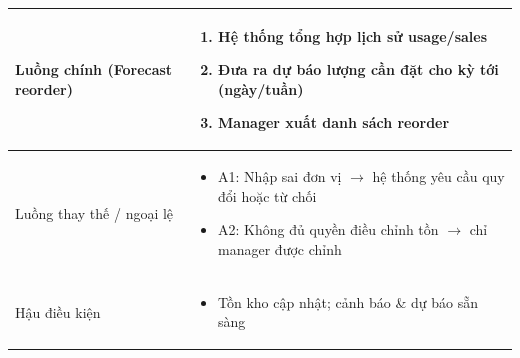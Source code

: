 \begin{longtable}{|>{\raggedright\arraybackslash}p{}|>{\raggedright\arraybackslash}p{}|}
\\
\hline
Luồng chính (Forecast reorder) &
\vspace{-0.5em}
\begin{enumerate}[leftmargin=*]
\item Hệ thống tổng hợp lịch sử usage/sales
\item Đưa ra dự báo lượng cần đặt cho kỳ tới (ngày/tuần)
\item Manager xuất danh sách reorder
\end{enumerate}
\vspace{-0.5em}
\\
\hline
Luồng thay thế / ngoại lệ &
\vspace{-0.5em}
\begin{itemize}[leftmargin=*]
\item A1: Nhập sai đơn vị $\rightarrow$ hệ thống yêu cầu quy đổi hoặc từ chối
\item A2: Không đủ quyền điều chỉnh tồn $\rightarrow$ chỉ manager được chỉnh
\end{itemize}
\vspace{-0.5em}
\\
\hline
Hậu điều kiện &
\vspace{-0.5em}
\begin{itemize}[leftmargin=*]
\item Tồn kho cập nhật; cảnh báo \& dự báo sẵn sàng
\end{itemize}
\vspace{-0.5em}
\\
\hline
\end{longtable}

